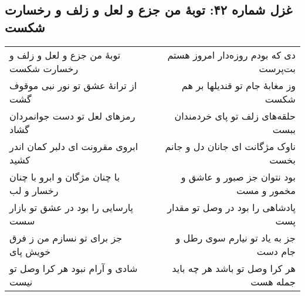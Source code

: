 \begin{center}
\section*{غزل شماره ۴۲: توبهٔ من جزع و لعل و زلف و رخسارت شکست}
\label{sec:042}
\begin{longtable}{l p{0.5cm} r}
توبهٔ من جزع و لعل و زلف و رخسارت شکست
&&
دی که بودم روزه‌دار امروز هستم بت‌پرست
\\
از ترانهٔ عشق تو نور نبی موقوف گشت
&&
وز مغابهٔ جام تو قندیلها بر هم شکست
\\
رمزهای لعل تو دست جوانمردان گشاد
&&
حلقه‌های زلف تو پای خردمندان ببست
\\
ابروی مقرونت ای دلبر کمان اندر کشید
&&
ناوک مژگانت ای جانان دل و جانم بخست
\\
با چنان مژگان و ابرو با چنان رخسار و لب
&&
بود نتوان جز صبور و عاشق و مخمور و مست
\\
پارسایی را بود در عشق تو بازار سست
&&
پادشاهی را بود در وصل تو مقدار پست
\\
جز برای تو نسازم من ز فرق خویش پای
&&
جز به یاد تو نیارم سوی رطل و جام دست
\\
شادی و آرام نبود هر کرا وصل تو نیست
&&
هر کرا وصل تو باشد هر چه باید جمله هست
\\
\end{longtable}
\end{center}

